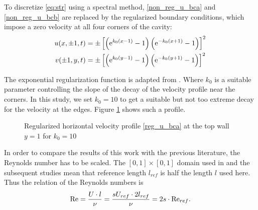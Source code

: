 To discretize \eqref{eq:str} using a spectral method, \eqref{non_reg_u_bca} and
\eqref{non_reg_u_bcb} are replaced by the regularized boundary conditions,
which impose a zero velocity at all four corners of the cavity:
\begin{align}
u(x,\pm 1,t) &= \pm\left[\left(\mathrm{e}^{k_0(x - 1)} - 1\right)
  \left(\mathrm{e}^{-k_0(x + 1)} - 1\right)\right]^2 \label{reg_u_bca} \\
v(\pm 1,y,t) &= \pm\left[\left(\mathrm{e}^{k_0(y - 1)} - 1\right)
  \left(\mathrm{e}^{-k_0(y + 1)} - 1\right)\right]^2 \label{reg_u_bcb}
\end{align}

The exponential regularization function is adapted from \citet{lopez2017}.
Where $k_0$ is a suitable parameter controlling the slope of the decay of the
velocity profile near the corners. In this study, we set $k_0=10$ to get a
suitable but not too extreme decay for the velocity at the edges. Figure
\ref{bc_profile} shows such a profile.

\begin{figure}[ht]
\center
{}
\caption{\label{bc_profile} Regularized horizontal velocity profile
  \eqref{reg_u_bca} at the top wall $y=1$ for $k_0=10$}
\end{figure}

In order to compare the results of this work with the previous literature, the
Reynolds number has to be scaled. The $[0,1] \times [0,1]$ domain used in
\citet{wahba2009} and the subsequent studies mean that reference length
$l_{ref}$ is half the length $l$ used here. Thus the relation
of the Reynolds numbers is
\vspace{-8pt}
\begin{align}
\mathrm{Re} = \frac{U \cdot l}{\nu} 
  = \frac{sU_{ref} \cdot 2l_{ref}}{\nu} = 2s \cdot \mathrm{Re}_{ref}.
\end{align}

